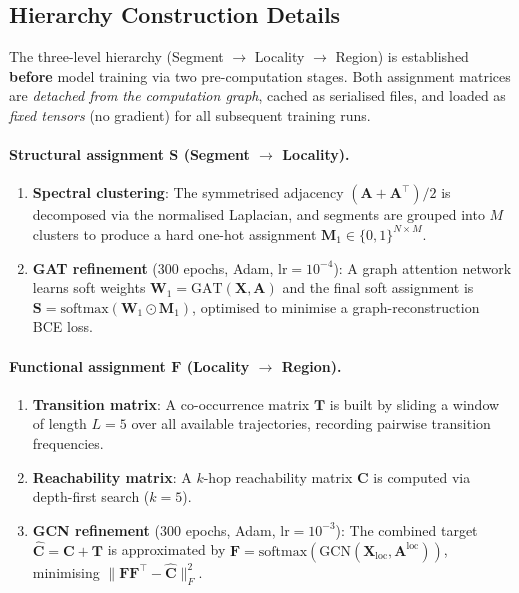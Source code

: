 \subsection{Hierarchy Construction Details}\label{subsec:hierarchy_details}

The three-level hierarchy (Segment $\to$ Locality $\to$ Region) is established \textbf{before} model training via two pre-computation stages.
Both assignment matrices are \emph{detached from the computation graph}, cached as serialised files, and loaded as \emph{fixed tensors} (no gradient) for all subsequent training runs.

\paragraph{Structural assignment $\mathbf{S}$ (Segment $\to$ Locality).}
\begin{enumerate}[leftmargin=*,itemsep=2pt]
  \item \textbf{Spectral clustering}: The symmetrised adjacency $(\mathbf{A}{+}\mathbf{A}^\top)/2$ is decomposed via the normalised Laplacian, and segments are grouped into $M$ clusters to produce a hard one-hot assignment $\mathbf{M}_1 \in \{0,1\}^{N \times M}$.
  \item \textbf{GAT refinement} (300 epochs, Adam, $\text{lr}{=}10^{-4}$): A graph attention network learns soft weights $\mathbf{W}_1 = \text{GAT}(\mathbf{X},\mathbf{A})$ and the final soft assignment is $\mathbf{S} = \text{softmax}(\mathbf{W}_1 \odot \mathbf{M}_1)$, optimised to minimise a graph-reconstruction BCE loss.
\end{enumerate}

\paragraph{Functional assignment $\mathbf{F}$ (Locality $\to$ Region).}
\begin{enumerate}[leftmargin=*,itemsep=2pt]
  \item \textbf{Transition matrix}: A co-occurrence matrix $\mathbf{T}$ is built by sliding a window of length $L{=}5$ over all available trajectories, recording pairwise transition frequencies.
  \item \textbf{Reachability matrix}: A $k$-hop reachability matrix $\mathbf{C}$ is computed via depth-first search ($k{=}5$).
  \item \textbf{GCN refinement} (300 epochs, Adam, $\text{lr}{=}10^{-3}$): The combined target $\hat{\mathbf{C}} = \mathbf{C} + \mathbf{T}$ is approximated by $\mathbf{F} = \text{softmax}(\text{GCN}(\mathbf{X}_{\text{loc}}, \mathbf{A}^{\text{loc}}))$, minimising $\|\mathbf{F}\mathbf{F}^\top - \hat{\mathbf{C}}\|_F^2$.
\end{enumerate}


